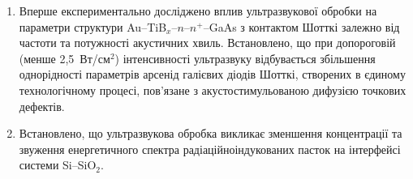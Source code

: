 \begin{enumerate}[leftmargin=0cm,itemindent=3em]
\item Вперше експериментально досліджено вплив ультразвукової обробки на параметри структури Au--TiB$_x$--$n$--$n^+$--GaAs з контактом Шотткі
 залежно від частоти та потужності акустичних хвиль.
 Встановлено, що при допороговій (менше 2,5~Вт/см$^2$) інтенсивності ультразвуку відбувається збільшення однорідності параметрів арсенід галієвих діодів Шотткі, створених в єдиному технологічному процесі, пов'язане з
 акустостимульованою дифузією точкових дефектів.



\item Встановлено, що ультразвукова обробка викликає зменшення концентрації та звуження енергетичного спектра радіаційноіндукованих пасток  на інтерфейсі системи   Si--SiO$_2$.

\end{enumerate}

